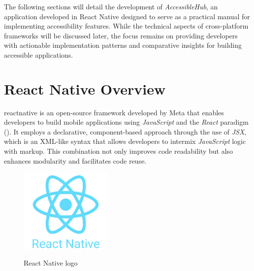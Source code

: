 The following sections will detail the development of \textit{AccessibleHub}, an application developed in React Native designed to serve as a practical manual for implementing accessibility features. While the technical aspects of cross-platform frameworks will be discussed later, the focus remains on providing developers with actionable implementation patterns and comparative insights for building accessible applications.

\section{React Native Overview}
\label{sec:reactnative-overview}

\gls{reactnative} is an open-source framework developed by Meta that enables developers to build mobile applications using \textit{JavaScript} and the \textit{React} paradigm (\cite{site:reactnative}). It employs a declarative, component-based approach through the use of \textit{JSX}, which is an XML-like syntax that allows developers to intermix \textit{JavaScript} logic with markup. This combination not only improves code readability but also enhances modularity and facilitates code reuse.

\begin{figure}[ht]
    \centering
    \includegraphics[width=0.4\textwidth, alt={React Native logo}]{img/react-native-logo.png}
    \caption{React Native logo}
\label{fig:reactnative-logo}
\end{figure}

